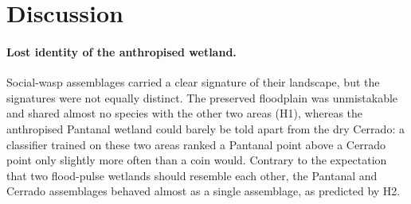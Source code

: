 \documentclass[10pt,a4paper,twocolumn]{article}
\makeatletter
\newcommand{\res}[1]{\ifcsname res@#1\endcsname\csname res@#1\endcsname\else\textcolor{red}{[#1?]}\fi}
\makeatother
\begin{document}
\section{Discussion}\label{sec:discussion}
\paragraph{Lost identity of the anthropised wetland.}
Social-wasp assemblages carried a clear signature of their landscape, but the signatures were not
equally distinct. The preserved floodplain was unmistakable and shared almost no species with the
other two areas (H1), whereas the anthropised Pantanal wetland could barely be told apart from the
dry Cerrado: a classifier trained on these two areas ranked a Pantanal point above a Cerrado point
only slightly more often than a coin would. Contrary to the expectation that two flood-pulse wetlands
should resemble each other, the Pantanal and Cerrado assemblages behaved almost as a single
assemblage, as predicted by H2.
\end{document}
